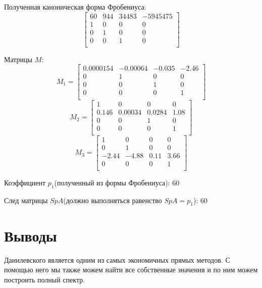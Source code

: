\documentclass[12pt]{report}
\begin{document}
Полученная каноническая форма Фробениуса:
\[
\begin{bmatrix}
60 & 944 & 34483 & -5945475 \\
1 & 0 & 0 & 0 \\
0 & 1 & 0 & 0 \\
0 & 0 & 1 & 0 \\
\end{bmatrix}
\]

Матрицы $M$:
\[
M_1 = 
\begin{bmatrix}
0.0000154 & -0.00064 & -0.035 & -2.46 \\
0 & 1 & 0 & 0 \\
0 & 0 & 1 & 0 \\
0 & 0 & 0 & 1 \\
\end{bmatrix}
\]
\[
M_2 = 
\begin{bmatrix}
1 & 0 & 0 & 0 \\
0.146 & 0.00034 & 0.0284 & 1.08 \\
0 & 0 & 1 & 0 \\
0 & 0 & 0 & 1 \\
\end{bmatrix}
\]
\[
M_3 = 
\begin{bmatrix}
1 & 0 & 0 & 0 \\
0 & 1 & 0 & 0 \\
-2.44 & -4.88 & 0.11 & 3.66 \\
0 & 0 & 0 & 1 \\
\end{bmatrix}
\]

Коэффициент $p_1$(полученный из формы Фробениуса): 60

След матрицы $Sp{A}$(должно выполняться равенство $Sp{A} = p_1$): 60

\section{Выводы}

 Данилевского является одним из самых экономичных прямых методов. С помощью него мы также можем найти все собственные значения и по ним можем построить полный спектр.
\end{document}
